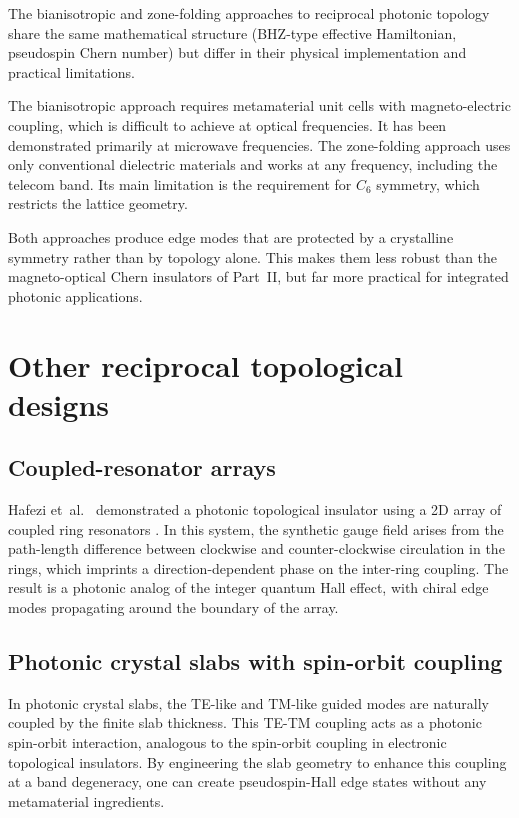 The bianisotropic and zone-folding approaches to reciprocal photonic
topology share the same mathematical structure (BHZ-type effective
Hamiltonian, pseudospin Chern number) but differ in their physical
implementation and practical limitations.

The bianisotropic approach requires metamaterial unit cells with
magneto-electric coupling, which is difficult to achieve at optical
frequencies.  It has been demonstrated primarily at microwave
frequencies.  The zone-folding approach uses only conventional
dielectric materials and works at any frequency, including the
telecom band.  Its main limitation is the requirement for $C_6$
symmetry, which restricts the lattice geometry.

Both approaches produce edge modes that are protected by a crystalline
symmetry rather than by topology alone.  This makes them less robust
than the magneto-optical Chern insulators of Part~II, but far more
practical for integrated photonic applications.

\section{Other reciprocal topological designs}
\label{sec:ch11-other}

\subsection{Coupled-resonator arrays}
\label{sec:ch11-coupled-resonators}

Hafezi et~al.\ \cite{hafezi2013imaging} demonstrated a photonic topological insulator
using a 2D array of coupled ring resonators \cite{hafezi2013imaging}.  In this system, the
synthetic gauge field arises from the path-length difference between
clockwise and counter-clockwise circulation in the rings, which
imprints a direction-dependent phase on the inter-ring coupling.  The
result is a photonic analog of the integer quantum Hall effect, with
chiral edge modes propagating around the boundary of the array.

\subsection{Photonic crystal slabs with spin-orbit coupling}
\label{sec:ch11-slabs}

In photonic crystal slabs, the TE-like and TM-like guided modes are
naturally coupled by the finite slab thickness.  This TE-TM coupling
acts as a photonic spin-orbit interaction, analogous to the spin-orbit
coupling in electronic topological insulators.  By engineering the
slab geometry to enhance this coupling at a band degeneracy, one can
create pseudospin-Hall edge states without any metamaterial
ingredients.


